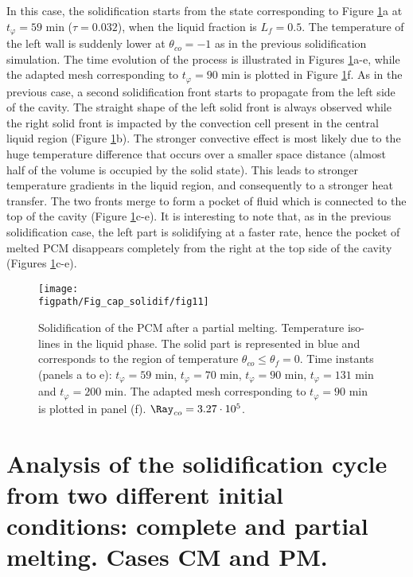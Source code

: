 In this case, the solidification starts from the state corresponding to Figure \ref{fig:evolution_t80}a at $t_{\varphi} = 59$ min ($\tau=0.032$), when the liquid fraction is $L_f = 0.5$. 
The temperature of the left wall is suddenly lower at $\theta_{co}=-1$ as in the previous solidification simulation.  
The time evolution of the process is illustrated in Figures \ref{fig:evolution_t80}a-e, while the adapted mesh corresponding to $t_{\varphi} = 90$ min is plotted in Figure \ref{fig:evolution_t80}f. 
As in the previous case, a second  solidification front starts to propagate from the left side of the cavity. 
The straight shape of the left solid front is always observed while the right solid front is impacted by the convection cell present in the central liquid region (Figure \ref{fig:evolution_t80}b). 
The stronger convective effect is most likely due to the huge temperature difference that occurs over a smaller space distance (almost half of the volume is occupied by the solid state). 
This leads to stronger temperature gradients in the liquid region, and consequently to a stronger heat transfer.   
The two fronts merge to form a pocket of fluid which is connected to the top of the cavity (Figure \ref{fig:evolution_t80}c-e). 
It is interesting to  note that, as in the previous solidification case, the left part is solidifying at a faster rate, hence the pocket of melted PCM disappears completely from the right at the top side of the cavity (Figures \ref{fig:evolution_t80}c-e).
\begin{figure}
	\begin{center}
		\texttt{[image: \\figpath/Fig\_cap\_solidif/fig11]}
	\end{center}
	\caption{Solidification of the PCM after a partial melting. Temperature iso-lines in the liquid phase. The solid part is represented in blue and corresponds to the region of temperature $\theta_{co} \leq \theta_f=0$. Time instants (panels  a to e): $t_{\varphi} = 59$ min, $t_{\varphi} = 70$ min, $t_{\varphi} = 90$ min, $t_{\varphi} = 131$ min and $t_{\varphi} = 200$ min. The adapted mesh corresponding to $t_{\varphi} = 90$ min is plotted in panel (f).  $ \Ray_{co}=3.27 \cdot 10^5$.}\label{fig:evolution_t80}
\end{figure}

\section{Analysis of the solidification cycle from two different initial conditions: complete and partial melting. Cases CM and PM. } \label{sec_freezing_full} 

